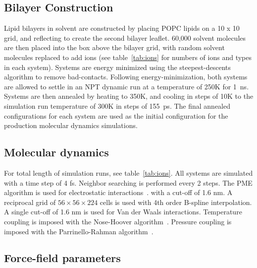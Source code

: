 \documentclass[journal=langd5,manuscript=article]{achemso}
\begin{document}
\subsection{Bilayer Construction}
Lipid bilayers in solvent are constructed by placing POPC lipids on a 10 x 10 grid,
and reflecting to create the second bilayer leaflet. 60,000 solvent molecules are then placed 
into the box above the bilayer grid, with random solvent molecules replaced to 
add ions (see table~\ref{tab:ions} for numbers of ions and types in each system).
Systems are energy minimized using the steepest-descents algorithm to remove bad-contacts.
Following energy-minimization, both systems are allowed to settle in an NPT dynamic
run at a temperature of 250K for 1~ns. Systems are then annealed by heating to 350K, and
cooling in steps of 10K to the simulation run temperature of 300K in steps of 
155~ps. The final annealed configurations for each system are used as the initial
configuration for the production molecular dynamics simulations.
\subsection{Molecular dynamics}
For total length of simulation runs, see table~\ref{tab:ions}.
All systems are simulated with a time step of 4 fs.
Neighbor searching is performed every 2 steps.
The PME algorithm is used for electrostatic interactions~\cite{essmann:1995}.
with a cut-off of 1.6 nm.
A reciprocal grid of $56 \times 56 \times 224$ cells is used with 4th order B-spline interpolation.
A single cut-off of 1.6 nm is used for Van der Waals interactions.
Temperature coupling is imposed with the Nose-Hoover algorithm~\cite{nose:1983}.
Pressure coupling is imposed with the Parrinello-Rahman algorithm~\cite{parrinello:1981}.

\subsection{Force-field parameters}
\end{document}
